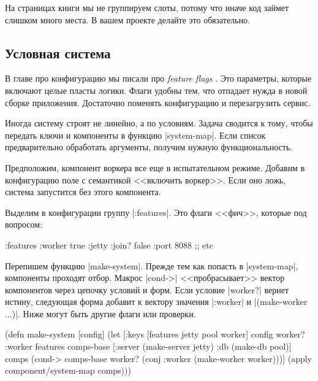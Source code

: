 На страницах книги мы не группируем слоты, потому что иначе код займет слишком
много места. В вашем проекте делайте это обязательно.

\subsection{Условная система}

В главе про конфигурацию мы писали про \emph{feature flags} .
Это параметры, которые включают целые пласты логики. Флаги удобны тем,
что отпадает нужда в новой сборке приложения. Достаточно поменять
конфигурацию и перезагрузить сервис.

Иногда систему строят не линейно, а по условиям. Задача сводится к тому, чтобы
передать ключи и компоненты в функцию \spverb|system-map|. Если список
предварительно обработать аргументы, получим нужную функциональность.

Предположим, компонент воркера все еще в испытательном режиме. Добавим в
конфигурацию поле с семантикой <<включить воркер>>. Если оно ложь, система
запустится без этого компонента.

Выделим в конфигурации группу \spverb|:features|. Это флаги <<фич>>, которые под
вопросом:

\begin{english}
  \begin{clojure}
{:features {:worker true}
 :jetty {:join? false :port 8088}
 ;; etc
}
  \end{clojure}
\end{english}

Перепишем функцию \spverb|make-system|. Прежде тем как попасть в
\spverb|system-map|, компоненты проходят отбор. Макрос \spverb|cond->|
<<пробрасывает>> вектор компонентов через цепочку условий и форм. Если условие
\spverb|worker?| вернет истину, следующая форма добавит к вектору значения
\spverb|:worker| и \spverb|(make-worker {...})|. Ниже могут быть другие флаги
или проверки.

\begin{english}
  \begin{clojure}
(defn make-system [config]
  (let [{:keys [features jetty pool worker]} config
        {worker? :worker} features
        comps-base [:server (make-server jetty)
                    :db (make-db pool)]
        comps (cond-> comps-base
                worker?
                (conj :worker (make-worker worker)))]
    (apply component/system-map comps)))
  \end{clojure}
\end{english}

